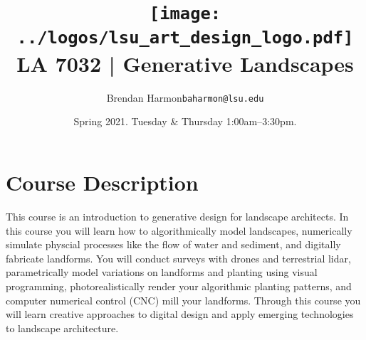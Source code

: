 \documentclass[11pt,article,oneside]{memoir}
\makeatletter
\def\myauthor{Author}
\def\mytitle{Title}
\def\myemail{baharmon@lsu.edu}
\def\myauthor{Brendan Harmon}
\def\mytitle{ \texttt{[image: ../logos/lsu\_art\_design\_logo.pdf]} \\[0.1cm] {\normalfont \normalsize LA 7032 |} \Large Generative Landscapes}
\newcommand{\globalcolor}[1]{%
  \color{#1}\global\let\default@color\current@color
}
\makeatother
\begin{document}
\setlength\bibitemsep{0.5em}

\setmainfont[Scale=1, Path = ../fonts/lato/,BoldItalicFont=Lato-RegIta,BoldFont=Lato-Reg,ItalicFont=Lato-LigIta]{Lato-Lig}
\setsansfont[Scale=1, Path = ../fonts/lato/,BoldItalicFont=Lato-RegIta,BoldFont=Lato-Reg,ItalicFont=Lato-LigIta]{Lato-Lig}
\setmonofont[Mapping=tex-text,Scale=0.8,Path = ../fonts/inconsolata/]{i}

\def\ind{\hangindent=1 true cm\hangafter=1 \noindent}
\def\labelitemi{$\cdot$}

\title{\LARGE \mytitle}
\author{\Large\myauthor \newline \footnotesize\texttt{\noindent\myemail}}
\date{Spring 2021. \newline Tuesday \& Thursday 1:00am--3:30pm.} %
\published{\,}


\globalcolor{black}
\vspace*{-10em}
\maketitle
{}
\clearpage



\globalcolor{black}

\vspace*{-10em}
\maketitle

\section{Course Description}

This course is an introduction to 
generative design for landscape architects.
%
In this course you will learn how to 
algorithmically model landscapes,
numerically simulate physcial processes 
like the flow of water and sediment,
and digitally fabricate landforms.  
%
You will conduct surveys with drones and terrestrial lidar,
parametrically model variations on landforms and planting
using visual programming, 
photorealistically render your algorithmic planting patterns,
and computer numerical control (CNC) mill your landforms. 
%
Through this course you will 
learn creative approaches to digital design 
and apply emerging technologies to landscape architecture.
\\
\end{document}

